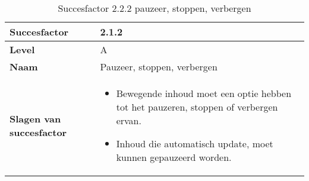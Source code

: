 \begin{table}[H]
    \centering
    \caption{Succesfactor 2.2.2 pauzeer, stoppen, verbergen}
    
    
    \hspace*{-1cm}\begin{tabular}{|l|p{12cm}|} 
        \hline
        \textbf{Succesfactor}                 & 2.1.2                                                                                                                                                                                                                                                                                                                                                                                                                                                                                                          \\ 
        \hline
        \textbf{Level}                        & A                                                                                                                                                                                                                                                                                                                                                                                                                                                                                                                 \\ 
        \hline
        \textbf{Naam}                         & Pauzeer, stoppen, verbergen~                                                                                                                                                                                                                                                                                                                                                                                                                                                                                      \\ 
        \hline
        \textbf{Slagen van succesfactor}      & \begin{itemize}
            \item Bewegende inhoud moet een optie hebben tot het pauzeren, stoppen of verbergen ervan. 
            \item Inhoud die automatisch update, moet kunnen gepauzeerd worden.
        \end{itemize}                                                                                                                                                                   \\ 

\end{tabular}
\end{table}
